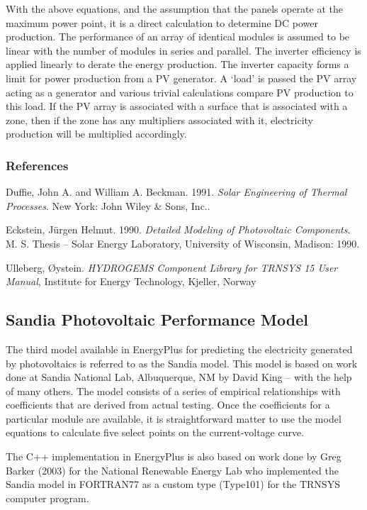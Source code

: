 With the above equations, and the assumption that the panels operate at the maximum power point, it is a direct calculation to determine DC power production. The performance of an array of identical modules is assumed to be linear with the number of modules in series and parallel. The inverter efficiency is applied linearly to derate the energy production. The inverter capacity forms a limit for power production from a PV generator. A `load' is passed the PV array acting as a generator and various trivial calculations compare PV production to this load. If the PV array is associated with a surface that is associated with a zone, then if the zone has any multipliers associated with it, electricity production will be multiplied accordingly.

\subsubsection{References}\label{references-035}

Duffie, John A. and William A. Beckman. 1991. \emph{Solar Engineering of Thermal Processes}. New York: John Wiley \& Sons, Inc..

Eckstein, Jürgen Helmut. 1990. \emph{Detailed Modeling of Photovoltaic Components}. M. S. Thesis -- Solar Energy Laboratory, University of Wisconsin, Madison: 1990.

Ulleberg, Øystein. \emph{HYDROGEMS Component Library for TRNSYS 15 User Manual}, Institute for Energy Technology, Kjeller, Norway \emph{~}

\subsection{Sandia Photovoltaic Performance Model}\label{sandia-photovoltaic-performance-model}

The third model available in EnergyPlus for predicting the electricity generated by photovoltaics is referred to as the Sandia model. This model is based on work done at Sandia National Lab, Albuquerque, NM by David King -- with the help of many others. The model consists of a series of empirical relationships with coefficients that are derived from actual testing. Once the coefficients for a particular module are available, it is straightforward matter to use the model equations to calculate five select points on the current-voltage curve.

The C++ implementation in EnergyPlus is also based on work done by Greg Barker (2003) for the National Renewable Energy Lab who implemented the Sandia model in FORTRAN77 as a custom type (Type101) for the TRNSYS computer program.


